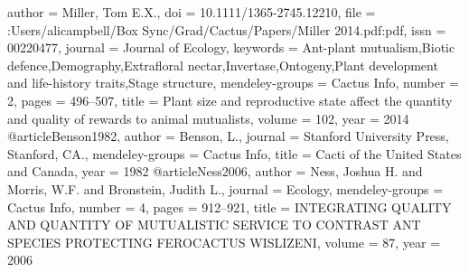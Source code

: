 {author = {Miller, Tom E.X.},
doi = {10.1111/1365-2745.12210},
file = {:Users/alicampbell/Box Sync/Grad/Cactus/Papers/Miller 2014.pdf:pdf},
issn = {00220477},
journal = {Journal of Ecology},
keywords = {Ant-plant mutualism,Biotic defence,Demography,Extrafloral nectar,Invertase,Ontogeny,Plant development and life-history traits,Stage structure},
mendeley-groups = {Cactus Info},
number = {2},
pages = {496--507},
title = {{Plant size and reproductive state affect the quantity and quality of rewards to animal mutualists}},
volume = {102},
year = {2014}
}
@article{Benson1982,
author = {Benson, L.},
journal = {Stanford University Press, Stanford, CA.},
mendeley-groups = {Cactus Info},
title = {{Cacti of the United States and Canada}},
year = {1982}
}
@article{Ness2006,
author = {Ness, Joshua H. and Morris, W.F. and Bronstein, Judith L.},
journal = {Ecology},
mendeley-groups = {Cactus Info},
number = {4},
pages = {912--921},
title = {{INTEGRATING QUALITY AND QUANTITY OF MUTUALISTIC SERVICE TO CONTRAST ANT SPECIES PROTECTING FEROCACTUS WISLIZENI}},
volume = {87},
year = {2006}
}
